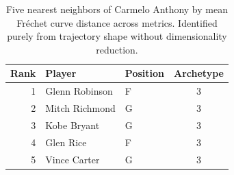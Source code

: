 \begin{table}[htbp]
  \centering\small
  \begin{tabular}{rllc}
    \toprule
    Rank & Player & Position & Archetype \\
    \midrule
    1 & Glenn Robinson & F & 3 \\
    2 & Mitch Richmond & G & 3 \\
    3 & Kobe Bryant & G & 3 \\
    4 & Glen Rice & F & 3 \\
    5 & Vince Carter & G & 3 \\
    \bottomrule
  \end{tabular}
  \caption{Five nearest neighbors of Carmelo Anthony by mean Fr\'{e}chet curve distance across metrics. Identified purely from trajectory shape without dimensionality reduction.}
  \label{tab:Carmelo_Anthony_frechet_curve_neighbors}
\end{table}

